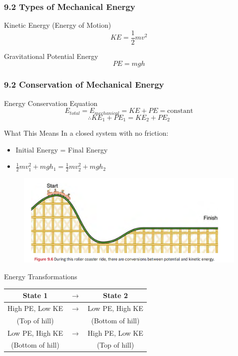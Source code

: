 \documentclass{beamer}
\begin{document}
\begin{frame}
\frametitle{9.2 Types of Mechanical Energy}
\begin{block}{Kinetic Energy (Energy of Motion)}
$$KE = \frac{1}{2}mv^2$$
\end{block}

\begin{block}{Gravitational Potential Energy}
$$PE = mgh$$
\end{block}
\end{frame}

\begin{frame}
\frametitle{9.2 Conservation of Mechanical Energy}
\begin{block}{Energy Conservation Equation}
$$E_{total} = E_{mechanical} = KE + PE = \text{constant}$$
$$\therefore KE_1 + PE_1 = KE_2 + PE_2$$
\end{block}

\begin{alertblock}{What This Means}
In a closed system with no friction:
\begin{itemize}
\item Initial Energy = Final Energy
\item $\frac{1}{2}mv_1^2 + mgh_1 = \frac{1}{2}mv_2^2 + mgh_2$
\end{itemize}
\end{alertblock}
\end{frame}

\begin{frame}
\begin{figure}
    \centering
    \includegraphics[width=0.5\linewidth]{coaster.png}
\end{figure}
\begin{block}{Energy Transformations}
\begin{center}
\begin{tabular}{c c c}
\textbf{State 1} & $\rightarrow$ & \textbf{State 2} \\
\hline
High PE, Low KE & $\rightarrow$ & Low PE, High KE \\
(Top of hill) & & (Bottom of hill) \\[1em]
Low PE, High KE & $\rightarrow$ & High PE, Low KE \\
(Bottom of hill) & & (Top of hill)
\end{tabular}
\end{center}
\end{block}
\end{frame}
\end{document}
